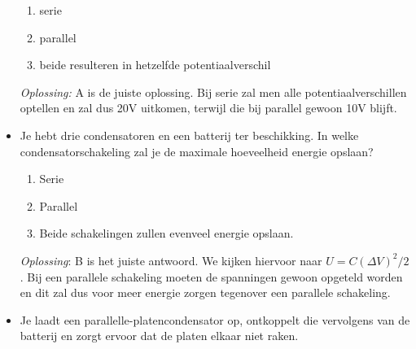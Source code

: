 \documentclass[12pt,a4paper]{article}
\begin{document}
\begin{itemize}
	\begin{enumerate}[label=\alph*]
		\item serie
		\item parallel
		\item beide resulteren in hetzelfde potentiaalverschil
	\end{enumerate}
	\textit{Oplossing:} A is de juiste oplossing. Bij serie zal men alle potentiaalverschillen optellen en zal dus 20V uitkomen, terwijl die bij parallel gewoon 10V blijft. 
	\item Je hebt drie condensatoren en een batterij ter beschikking. In welke condensatorschakeling zal je de maximale hoeveelheid energie opslaan?
	\begin{enumerate}[label=\alph*]
		\item Serie
		\item Parallel
		\item Beide schakelingen zullen evenveel energie opslaan.
	\end{enumerate}
	\textit{Oplossing}: B is het juiste antwoord. We kijken hiervoor naar \(U = C(\Delta V)^2 / 2\). Bij een parallele schakeling moeten de spanningen gewoon opgeteld worden en dit zal dus voor meer energie zorgen tegenover een parallele schakeling.
	\item Je laadt een parallelle-platencondensator op, ontkoppelt die vervolgens van de batterij en zorgt ervoor dat de platen elkaar niet raken. 
	

\end{itemize}
\end{document}
